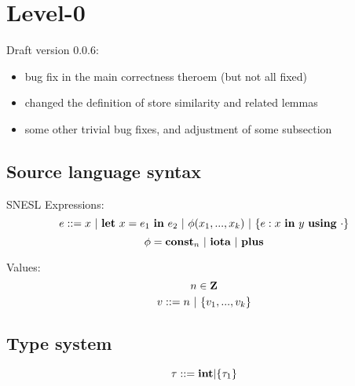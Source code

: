 \def\sfun#1#2{(#1,#2)}

\def\Trans#1#2#3#4#5{#1 \Env #2 \=>{#3}{#4} #5}
\def\Transf#1#2#3#4#5{#1(#2) \=>{#3}{#4} #5}
 
 
\def\S{\mathbf{S}}
\def\FV#1{\mathbf{FV}(#1)}



\newcommand{\eq}[2]{\begin{equation}\label{#1} #2\end{equation}}

\providecommand{\versionnumber}{0.0.6}


\section{Level-0}

Draft version \versionnumber: 
\begin{itemize}
	\item bug fix in the main correctness theroem (but not all fixed)
	\item changed the definition of store similarity and related lemmas
	\item some other trivial bug fixes, and adjustment of some subsection
\end{itemize}


\subsection{Source language syntax}
SNESL Expressions:
$$e ::= x \ | \ \Let{x}{e_1}{e_2} \ | \ \hcall{\Tupk{x}} \ | \ \Comp{e}{x}{y}{\cdot} $$
$$\phi = \mathbf{const}_n \ | \ \mathbf{iota} \ | \ \mathbf{plus} $$ 

Values: \\
$$ n \in \mathbf{Z} $$
$$ v::= n \ | \ \{ v_1,...,v_k \}$$

\subsection{Type system}
$$\tau ::= \mathbf{int} | \{\tau_1\}$$

